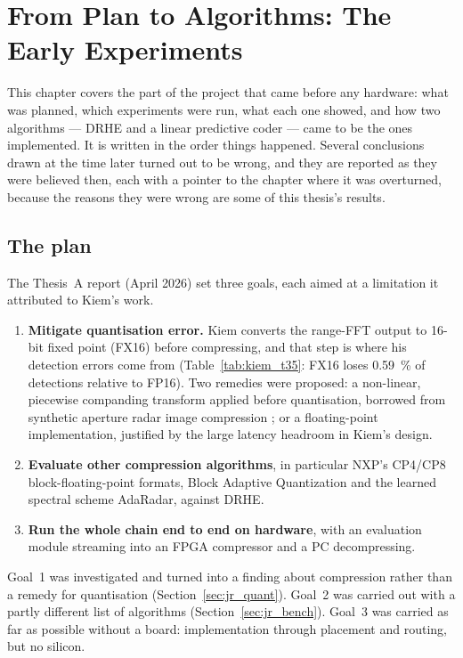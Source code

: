 \chapter{From Plan to Algorithms: The Early Experiments}
\label{ch:journey}

This chapter covers the part of the project that came before any hardware:
what was planned, which experiments were run, what each one showed, and how
two algorithms --- DRHE and a linear predictive coder --- came to be the ones
implemented. It is written in the order things happened. Several conclusions
drawn at the time later turned out to be wrong, and they are reported as they
were believed then, each with a pointer to the chapter where it was
overturned, because the reasons they were wrong are some of this thesis's
results.

\section{The plan}
\label{sec:jr_plan}

The Thesis~A report (April 2026) set three goals, each aimed at a limitation
it attributed to Kiem's work.

\begin{enumerate}
\item \textbf{Mitigate quantisation error.} Kiem converts the range-FFT output
to 16-bit fixed point (FX16) before compressing, and that step is where his
detection errors come from (Table~\ref{tab:kiem_t35}: FX16 loses
\SI{0.59}{\percent} of detections relative to FP16). Two remedies were
proposed: a non-linear, piecewise companding transform applied before
quantisation, borrowed from synthetic aperture radar image compression
\cite{deng2024}; or a floating-point implementation, justified by the large
latency headroom in Kiem's design.
\item \textbf{Evaluate other compression algorithms}, in particular NXP's
CP4/CP8 block-floating-point formats, Block Adaptive Quantization and the
learned spectral scheme AdaRadar, against DRHE.
\item \textbf{Run the whole chain end to end on hardware}, with an evaluation
module streaming into an FPGA compressor and a PC decompressing.
\end{enumerate}

\noindent
Goal~1 was investigated and turned into a finding about compression rather
than a remedy for quantisation (Section~\ref{sec:jr_quant}). Goal~2 was carried
out with a partly different list of algorithms (Section~\ref{sec:jr_bench}).
Goal~3 was carried as far as possible without a board: implementation through
placement and routing, but no silicon.

